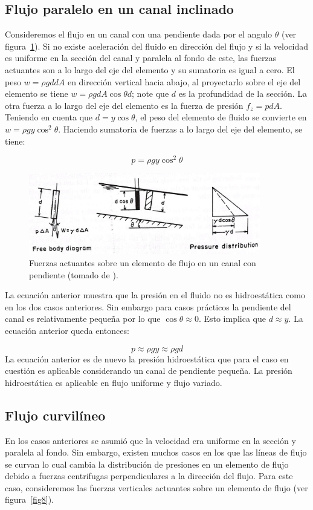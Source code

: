 \documentclass[11pt, oneside]{article}
\begin{document}
\subsection{Flujo paralelo en un canal inclinado}
Consideremos el flujo en un canal con una pendiente dada por el angulo $\theta$ (ver figura~\ref{fig7}). Si no existe aceleraci\'on del fluido en direcci\'on del flujo y si la velocidad es uniforme en la secci\'on del canal y paralela al fondo de este, las fuerzas actuantes son a lo largo del eje del elemento y su sumatoria es igual a cero. El peso  $w=\rho g d dA$ en direcci\'on vertical hacia abajo, al proyectarlo sobre el eje del elemento se tiene $w=\rho g dA \cos \theta d$; note que $d$ es la profundidad de la secci\'on. La otra fuerza a lo largo del eje del elemento es la fuerza de presi\'on $f_z=p dA$. Teniendo en cuenta que $d= y \cos \theta$, el peso del elemento de fluido se convierte en $w = \rho g y \cos^2 \theta$. Haciendo sumatoria de fuerzas a lo largo del eje del elemento, se tiene:

$$
p=\rho g y \cos^2 \theta
$$

\begin{figure}[h]
\centering
\includegraphics[width=0.9\textwidth]{fig7.jpeg}
\caption{Fuerzas actuantes sobre un elemento de flujo en un canal con pendiente (tomado de \cite{Chau}).}
\label{fig7}
\end{figure}


La ecuaci\'on anterior muestra que la presi\'on en el fluido no es hidroest\'atica como en los dos casos anteriores. Sin embargo para casos pr\'acticos la pendiente del canal es relativamente pequeña por lo que $\cos \theta \approx 0$. Esto implica que $d \approx y$. La ecuaci\'on anterior queda entonces:

$$
p \approx \rho g y \approx \rho g d
$$
La ecuaci\'on anterior es de nuevo la presi\'on hidroest\'atica que para el caso en cuesti\'on es aplicable considerando un canal de pendiente pequeña. La presi\'on hidroest\'atica es aplicable en flujo uniforme y flujo variado.

\subsection{Flujo curvil\'ineo}
En los casos anteriores se asumi\'o que la velocidad era uniforme en la secci\'on y paralela al fondo. Sin embargo, existen muchos casos en los que las l\'ineas de flujo se curvan lo cual cambia la distribuci\'on de presiones en un elemento de flujo debido a fuerzas centrifugas perpendiculares a la direcci\'on del flujo. Para este caso, consideremos las fuerzas verticales actuantes sobre un elemento de flujo (ver figura~\ref{fig8}).
\end{document}
